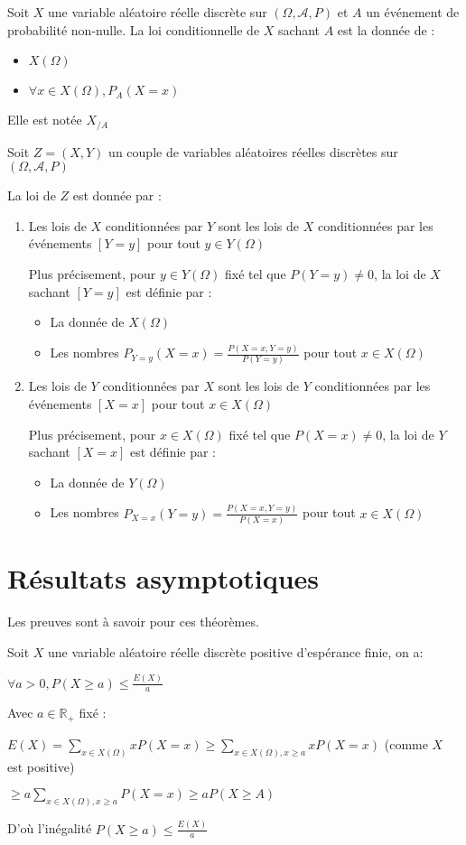 \documentclass[a4paper,12pt]{book}
\newcommand{\Def}[2]{\begin{tcolorbox}[colback=white,colframe=red!10!green!20!blue!75!, title=Définition : #1]#2\end{tcolorbox}}
\newcommand{\Thr}[2]{\begin{tcolorbox}[sharp corners, colback=white,colframe=red!10!blue!30!green!75!, title=Théorème : #1]#2\end{tcolorbox}}
\newcommand{\Pre}[1]{\begin{tcolorbox}[sharp corners, colback=white,colframe=green!60!green!30!black!75, title=Preuve]#1\end{tcolorbox}}
\def\R{\mathbb{R}}
\begin{document}
\Def{}{Soit $X$ une variable aléatoire réelle discrète sur $(\Omega,\mathcal{A}, P)$ et $A$ un événement de probabilité non-nulle. La loi conditionnelle de $X$ sachant $A$ est la donnée de :\begin{itemize}
\item $X(\Omega)$
\item $\forall x\in X(\Omega), P_A(X=x)$
\end{itemize}
Elle est notée $X_{/A}$}
\Def{}{Soit $Z=(X,Y)$ un couple de variables aléatoires réelles discrètes sur $(\Omega, \mathcal{A}, P)$
\par La loi de $Z$ est donnée par :\begin{enumerate}
\item Les lois de $X$ conditionnées par $Y$ sont les lois de $X$ conditionnées par les événements $[Y=y]$ pour tout $y\in Y(\Omega)$
\par Plus précisement, pour $y\in Y(\Omega)$ fixé tel que $P(Y=y)\neq 0$, la loi de $X$ sachant $[Y=y]$ est définie par :\begin{itemize}
    \item La donnée de $X(\Omega)$
    \item Les nombres $P_{Y=y}(X=x)=\frac{P(X=x,Y=y)}{P(Y=y)}$ pour tout $x\in X(\Omega)$
\end{itemize}
\item Les lois de $Y$ conditionnées par $X$ sont les lois de $Y$ conditionnées par les événements $[X=x]$ pour tout $x\in X(\Omega)$
\par Plus précisement, pour $x\in X(\Omega)$ fixé tel que $P(X=x)\neq 0$, la loi de $Y$ sachant $[X=x]$ est définie par :\begin{itemize}
    \item La donnée de $Y(\Omega)$
    \item Les nombres $P_{X=x}(Y=y)=\frac{P(X=x,Y=y)}{P(X=x)}$ pour tout $x\in X(\Omega)$
\end{itemize}
\end{enumerate}}


\section{Résultats asymptotiques}
Les preuves sont à savoir pour ces théorèmes.
\Thr{Inégalité de Markov}{Soit $X$ une variable aléatoire réelle discrète positive d'espérance finie, on a:
\par\begin{center}$\forall a>0, P(X\geq a)\leq \frac{E(X)}{a}$\end{center}}
\Pre{Avec $a\in\R_+$ fixé :
\par $E(X) = \sum\limits_{x\in X(\Omega)}xP(X=x) \geq \sum\limits_{x\in X(\Omega),x\geq a}xP(X=x)$ (comme $X$ est positive)
\par $\geq a\sum\limits_{x\in X(\Omega), x\geq a} P(X=x)\geq aP(X\geq A)$
\par D'où l'inégalité $P(X\geq a)\leq \frac{E(X)}{a}$}
\end{document}
